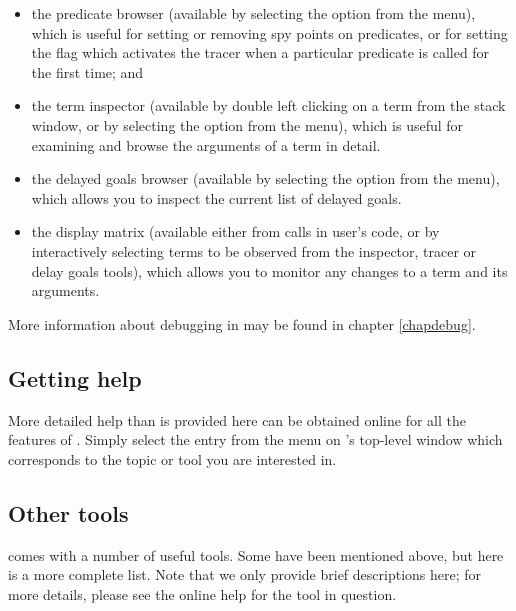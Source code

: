 \begin{itemize}

\item the predicate browser (available by selecting the  option from the  menu), which is useful for setting
or removing spy points on predicates, or for setting the
flag which activates the tracer when a particular predicate is called for
the first time; and

\item the term inspector (available by double left clicking on a term from
the stack window, or by selecting the 
option from the  menu), which is useful for examining and
browse the arguments of a term in detail.

\item the delayed goals browser (available by selecting the  option from the  menu), which allows you to inspect
the current list of delayed goals.

\item the display matrix (available either from calls in user's code, or by
interactively selecting terms to be observed from the inspector, tracer or
delay goals tools), which allows you to monitor any changes to a term and
its arguments.

\end{itemize}

More information about debugging in {\eclipse} may be found in chapter
\ref{chapdebug}.

\subsection{Getting help}

More detailed help than is provided here can be obtained online for all
the features of {\tkeclipse}.
Simply select the entry from the  menu on {\tkeclipse}'s
top-level window which corresponds to the topic or tool you are interested
in.

\subsection{Other tools}

{\tkeclipse} comes with a number of useful tools.
Some have been mentioned above, but here is a more complete list.
Note that we only provide brief descriptions here; for more details, please
see the online help for the tool in question.

